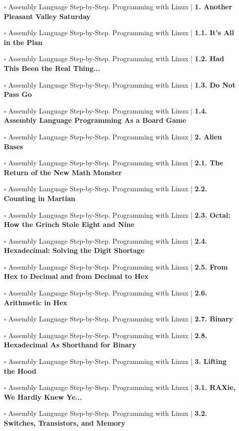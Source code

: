 \documentclass[a4, landscape, 12pt]{article}
\newcommand{\checkbox}{$\square$}%
\begin{document}
\begin{itemize}
{}
\item [\checkbox]  Assembly Language Step-by-Step. Programming with Linux | \textbf{ 1. Another Pleasant Valley Saturday
}
\item [\checkbox]  Assembly Language Step-by-Step. Programming with Linux | \textbf{ 1.1. It's All in the Plan
}
\item [\checkbox]  Assembly Language Step-by-Step. Programming with Linux | \textbf{ 1.2. Had This Been the Real Thing...
}
\item [\checkbox]  Assembly Language Step-by-Step. Programming with Linux | \textbf{ 1.3. Do Not Pass Go
}
\item [\checkbox]  Assembly Language Step-by-Step. Programming with Linux | \textbf{ 1.4. Assembly Language Programming As a Board Game
}
\item [\checkbox]  Assembly Language Step-by-Step. Programming with Linux | \textbf{ 2. Alien Bases
}
\item [\checkbox]  Assembly Language Step-by-Step. Programming with Linux | \textbf{ 2.1. The Return of the New Math Monster
}
\item [\checkbox]  Assembly Language Step-by-Step. Programming with Linux | \textbf{ 2.2. Counting in Martian
}
\item [\checkbox]  Assembly Language Step-by-Step. Programming with Linux | \textbf{ 2.3. Octal: How the Grinch Stole Eight and Nine
}
\item [\checkbox]  Assembly Language Step-by-Step. Programming with Linux | \textbf{ 2.4. Hexadecimal: Solving the Digit Shortage
}
\item [\checkbox]  Assembly Language Step-by-Step. Programming with Linux | \textbf{ 2.5. From Hex to Decimal and from Decimal to Hex
}
\item [\checkbox]  Assembly Language Step-by-Step. Programming with Linux | \textbf{ 2.6. Arithmetic in Hex
}
\item [\checkbox]  Assembly Language Step-by-Step. Programming with Linux | \textbf{ 2.7. Binary
}
\item [\checkbox]  Assembly Language Step-by-Step. Programming with Linux | \textbf{ 2.8. Hexadecimal As Shorthand for Binary
}
\item [\checkbox]  Assembly Language Step-by-Step. Programming with Linux | \textbf{ 3. Lifting the Hood
}
\item [\checkbox]  Assembly Language Step-by-Step. Programming with Linux | \textbf{ 3.1. RAXie, We Hardly Knew Ye...
}
\item [\checkbox]  Assembly Language Step-by-Step. Programming with Linux | \textbf{ 3.2. Switches, Transistors, and Memory
}
\end{itemize}
\end{document}
